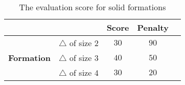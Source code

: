 \begin{table}[ht]
\centering
	\begin{tabular}{llccc}
		\cline{3-4}
		\multicolumn{1}{c}{} & \multicolumn{1}{c}{\normalsize } & \multicolumn{1}{|c}{\normalsize Score} & \multicolumn{1}{c|}{\normalsize Penalty} \\
		\hline
		\multicolumn{1}{|c|}{\multirow{3}{*}{\textbf{\normalsize Formation}}} & \multicolumn{1}{c}{\normalsize $\triangle$ of size 2} & \multicolumn{1}{|c}{$30$} & \multicolumn{1}{c|}{\normalsize $90$} \\
		\multicolumn{1}{|c|}{} & \multicolumn{1}{c}{\normalsize $\triangle$ of size 3} & \multicolumn{1}{|c}{$40$} & \multicolumn{1}{c|}{\normalsize $50$} \\
		\multicolumn{1}{|c|}{} & \multicolumn{1}{c}{\normalsize $\triangle$ of size 4} & \multicolumn{1}{|c}{$30$} & \multicolumn{1}{c|}{\normalsize $20$} \\
		\hline
	\end{tabular}
	\caption{The evaluation score for solid formations}
	\label{tab:evaluationsolidformations}
\end{table}